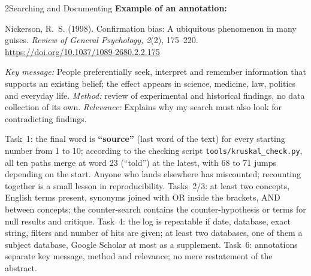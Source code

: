 \begin{uebungsblattb}{2}{Searching and Documenting}
\smallskip
\noindent\textbf{Example of an annotation:}

\noindent\begin{minipage}{\textwidth}\small
Nickerson, R.~S. (1998). Confirmation bias: A ubiquitous phenomenon in many
guises. \emph{Review of General Psychology, 2}(2), 175--220.
\url{https://doi.org/10.1037/1089-2680.2.2.175}

\emph{Key message:} People preferentially seek, interpret and remember
information that supports an existing belief; the effect appears in
science, medicine, law, politics and everyday life. \emph{Method:} review
of experimental and historical findings, no data collection of its own.
\emph{Relevance:} Explains why my search must also look for contradicting
findings.
\end{minipage}

\begin{lehrhinweis}
Task~1: the final word is \textbf{\enquote{source}} (last word of the text)
for every starting number from 1 to 10; according to the checking script
\texttt{tools/kruskal\_check.py}, all ten paths merge at word 23
(\enquote{told}) at the latest, with 68 to 71 jumps depending on the start.
Anyone who lands elsewhere has miscounted; recounting together is a small
lesson in reproducibility. Tasks~2/3: at least two concepts, English terms
present, synonyms joined with OR inside the brackets, AND between concepts;
the counter-search contains the counter-hypothesis or terms for null
results and critique. Task~4: the log is repeatable if date, database,
exact string, filters and number of hits are given; at least two
databases, one of them a subject database, Google Scholar at most as a
supplement. Task~6: annotations separate key message, method and
relevance; no mere restatement of the abstract.
\end{lehrhinweis}
\end{uebungsblattb}
